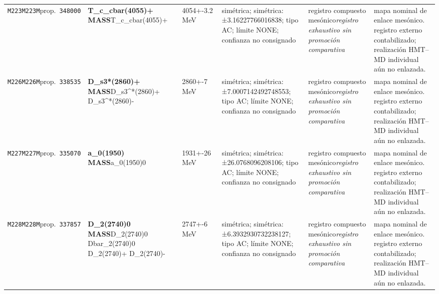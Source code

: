 \begin{landscape}
\begin{longtable}{L{1.85cm}L{4.45cm}L{2.35cm}L{4.05cm}L{3.35cm}L{7.15cm}}
\texttt{M223}\newline \texttt{M223M}\newline prop.\ \texttt{348000} & \textbf{T\_\allowbreak{}c\_\allowbreak{}cbar(4055)+ MASS}\newline T\_\allowbreak{}c\_\allowbreak{}cbar(4055)+ & 4054+-3.2\,MeV & simétrica; simétrica: ±3.16227766016838; tipo AC; límite NONE; confianza no consignado & registro compuesto mesónico\newline \emph{registro exhaustivo sin promoción comparativa} & mapa nominal de enlace mesónico. registro externo contabilizado; realización HMT--MD individual aún no enlazada. \\
\texttt{M226}\newline \texttt{M226M}\newline prop.\ \texttt{338535} & \textbf{D\_\allowbreak{}s3*(2860)+ MASS}\newline D\_\allowbreak{}s3\textasciicircum{}*(2860)+ \textbar{}\allowbreak{} D\_\allowbreak{}s3\textasciicircum{}*(2860)- & 2860+-7\,MeV & simétrica; simétrica: ±7.0007142492748553; tipo AC; límite NONE; confianza no consignado & registro compuesto mesónico\newline \emph{registro exhaustivo sin promoción comparativa} & mapa nominal de enlace mesónico. registro externo contabilizado; realización HMT--MD individual aún no enlazada. \\
\texttt{M227}\newline \texttt{M227M}\newline prop.\ \texttt{335070} & \textbf{a\_\allowbreak{}0(1950) MASS}\newline a\_\allowbreak{}0(1950)0 & 1931+-26\,MeV & simétrica; simétrica: ±26.0768096208106; tipo AC; límite NONE; confianza no consignado & registro compuesto mesónico\newline \emph{registro exhaustivo sin promoción comparativa} & mapa nominal de enlace mesónico. registro externo contabilizado; realización HMT--MD individual aún no enlazada. \\
\texttt{M228}\newline \texttt{M228M}\newline prop.\ \texttt{337857} & \textbf{D\_\allowbreak{}2(2740)0 MASS}\newline D\_\allowbreak{}2(2740)0 \textbar{}\allowbreak{} Dbar\_\allowbreak{}2(2740)0 \textbar{}\allowbreak{} D\_\allowbreak{}2(2740)+ \textbar{}\allowbreak{} D\_\allowbreak{}2(2740)- & 2747+-6\,MeV & simétrica; simétrica: ±6.3932930732238127; tipo AC; límite NONE; confianza no consignado & registro compuesto mesónico\newline \emph{registro exhaustivo sin promoción comparativa} & mapa nominal de enlace mesónico. registro externo contabilizado; realización HMT--MD individual aún no enlazada. \\

\end{longtable}
\end{landscape}
